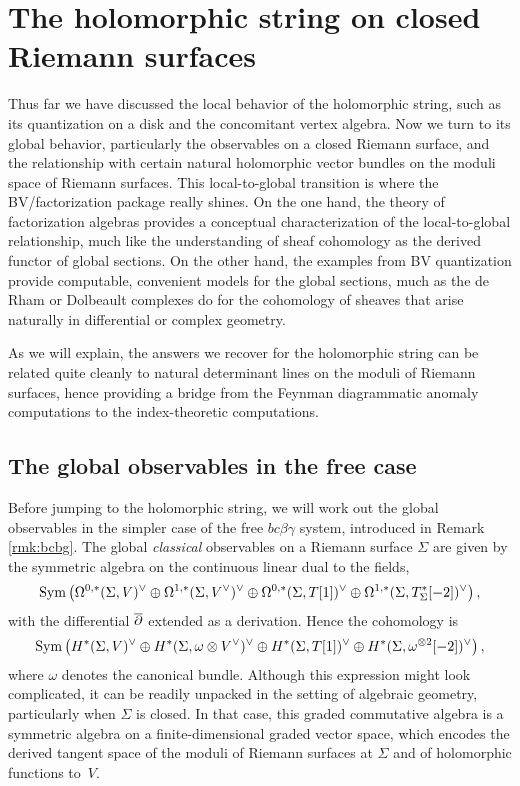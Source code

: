 \section{The holomorphic string on closed Riemann surfaces} 
\label{sec: conformalblock}

Thus far we have discussed the local behavior of the holomorphic string,
such as its quantization on a disk and the concomitant vertex algebra.
Now we turn to its global behavior, 
particularly the observables on a closed Riemann surface,
and the relationship with certain natural holomorphic vector bundles on the moduli space of Riemann surfaces.
This local-to-global transition is where the BV/factorization package really shines.
On the one hand, the theory of factorization algebras provides a conceptual characterization of the local-to-global relationship,
much like the understanding of sheaf cohomology as the derived functor of global sections.
On the other hand, the examples from BV quantization provide computable, convenient models for the global sections,
much as the de Rham or Dolbeault complexes do for the cohomology of sheaves that arise naturally in differential or complex geometry.

As we will explain, the answers we recover for the holomorphic string can be related quite cleanly to natural determinant lines on the moduli of Riemann surfaces,
hence providing a bridge from the Feynman diagrammatic anomaly computations to the index-theoretic computations.

\subsection{The global observables in the free case}

Before jumping to the holomorphic string, 
we will work out the global observables in the simpler case of the free $bc\beta\gamma$ system,
introduced in Remark \ref{rmk:bcbg}. 
The global {\it classical}\/ observables on a Riemann surface $\Sigma$ are given by the symmetric algebra on the continuous linear dual to the fields,
\[
{\rm Sym}\left(\Omega^{0,*}(\Sigma,V)^\vee \oplus \Omega^{1,*}(\Sigma,V^\vee)^\vee \oplus \Omega^{0,*}(\Sigma,T[1])^\vee \oplus \Omega^{1,*}(\Sigma,T^*_\Sigma[-2])^\vee \right),
\]
with the differential $\overline{\partial}$ extended as a derivation.
Hence the cohomology is
\[
{\rm Sym}\left(H^*(\Sigma,V)^\vee \oplus H^*(\Sigma,\omega \otimes V^\vee)^\vee \oplus H^*(\Sigma,T[1])^\vee \oplus H^*(\Sigma,\omega^{\otimes 2}[-2])^\vee\right),
\]
where $\omega$ denotes the canonical bundle.
Although this expression might look complicated, 
it can be readily unpacked in the setting of algebraic geometry, 
particularly when $\Sigma$ is closed.
In that case, this graded commutative algebra is a symmetric algebra on a finite-dimensional graded vector space,
which encodes the derived tangent space of the moduli of Riemann surfaces at $\Sigma$ and of holomorphic functions to~$V$. 

